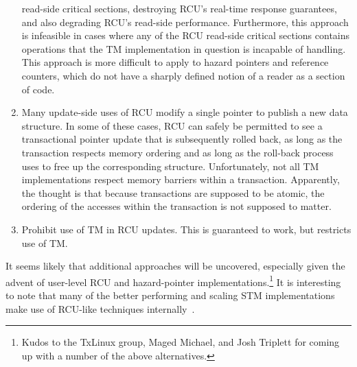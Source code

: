 \begin{enumerate}
	read-side critical sections, destroying RCU's real-time response
	guarantees, and also degrading RCU's read-side performance.
	Furthermore, this approach is infeasible in cases where any of
	the RCU read-side critical sections contains operations that
	the TM implementation in question is incapable of handling.
	This approach is more difficult to apply to hazard pointers and
	reference counters, which do not have a sharply defined notion
	of a reader as a section of code.
\item	Many update-side uses of RCU modify a single pointer to publish
	a new data structure.
	In some of these cases, RCU can safely be permitted to see a
	transactional pointer update that is subsequently rolled back,
	as long as the transaction respects memory ordering and as long
	as the roll-back process uses  to free up the
	corresponding structure.
	Unfortunately, not all TM implementations respect memory barriers
	within a transaction.
	Apparently, the thought is that because transactions are supposed
	to be atomic, the ordering of the accesses within the transaction
	is not supposed to matter.
\item	Prohibit use of TM in RCU updates.
	This is guaranteed to work, but restricts use of TM.
\end{enumerate}

It seems likely that additional approaches will be uncovered, especially
given the advent of user-level RCU and hazard-pointer
implementations.\footnote{
	Kudos to the TxLinux group, Maged Michael, and Josh Triplett
	for coming up with a number of the above alternatives.}
It is interesting to note that many of the better performing and
scaling STM implementations make use of RCU-like techniques
internally~\cite{UCAM-CL-TR-579,KeirFraser2007withoutLocks,Gu:2019:PSE:3358807.3358885,Kim:2019:MSR:3297858.3304040}.

